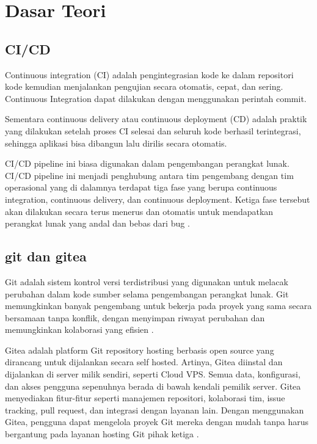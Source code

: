 \documentclass[12pt,a4paper]{article}
\begin{document}
\section{Dasar Teori}
\subsection{CI/CD}
Continuous integration (CI) adalah pengintegrasian kode ke dalam repositori kode kemudian menjalankan pengujian secara otomatis, cepat, dan sering. Continuous Integration dapat dilakukan dengan menggunakan perintah commit.

Sementara continuous delivery atau continuous deployment (CD) adalah praktik yang dilakukan setelah proses CI selesai dan seluruh kode berhasil terintegrasi, sehingga aplikasi bisa dibangun lalu dirilis secara otomatis.

CI/CD pipeline ini biasa digunakan dalam pengembangan perangkat lunak. CI/CD pipeline ini menjadi penghubung antara tim pengembang dengan tim operasional yang di dalamnya terdapat tiga fase yang berupa continuous integration, continuous delivery, dan continuous deployment. Ketiga fase tersebut akan dilakukan secara terus menerus dan otomatis untuk mendapatkan perangkat lunak yang andal dan bebas dari bug \cite{dicodingCICDDeveloper}.

\subsection{git dan gitea}
Git adalah sistem kontrol versi terdistribusi yang digunakan untuk melacak perubahan dalam kode sumber selama pengembangan perangkat lunak. Git memungkinkan banyak pengembang untuk bekerja pada proyek yang sama secara bersamaan tanpa konflik, dengan menyimpan riwayat perubahan dan memungkinkan kolaborasi yang efisien \cite{codepolitanGitPanduan}.

Gitea adalah platform Git repository hosting berbasis open source yang dirancang untuk dijalankan secara self hosted. Artinya, Gitea diinstal dan dijalankan di server milik sendiri, seperti Cloud VPS. Semua data, konfigurasi, dan akses pengguna sepenuhnya berada di bawah kendali pemilik server. Gitea menyediakan fitur-fitur seperti manajemen repositori, kolaborasi tim, issue tracking, pull request, dan integrasi dengan layanan lain. Dengan menggunakan Gitea, pengguna dapat mengelola proyek Git mereka dengan mudah tanpa harus bergantung pada layanan hosting Git pihak ketiga \cite{plasawebhostGiteaGitHub}.
\newpage
\end{document}
